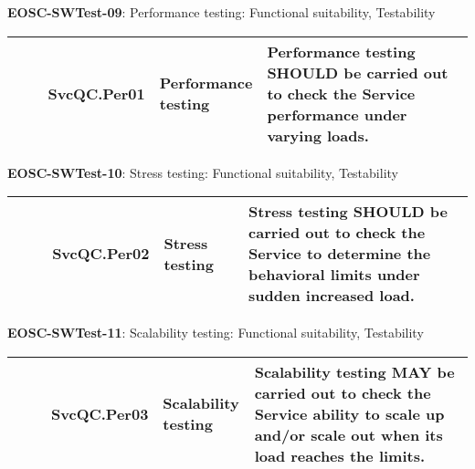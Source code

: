 \textbf{EOSC-SWTest-09}: Performance testing: Functional suitability, Testability
\nopagebreak[4]
\begin{center}
    \tabletail{\hline}
    \tiny
    \begin{supertabular}{|p{0.10\linewidth}|p{0.10\linewidth}|p{0.20\linewidth}|p{0.60\linewidth}|} \hline
        \cite{orviz_fernandez_eosc-synergy_2020} & SvcQC.Per01 & Performance testing & Performance testing SHOULD be carried out to check the Service performance under varying loads.\\ \hline
    \end{supertabular}
\end{center}

\textbf{EOSC-SWTest-10}: Stress testing: Functional suitability, Testability
\nopagebreak[4]
\begin{center}
    \tabletail{\hline}
    \tiny
    \begin{supertabular}{|p{0.10\linewidth}|p{0.10\linewidth}|p{0.20\linewidth}|p{0.60\linewidth}|} \hline
        \cite{orviz_fernandez_eosc-synergy_2020} & SvcQC.Per02 & Stress testing & Stress testing SHOULD be carried out to check the Service to determine the behavioral limits under sudden increased load.\\ \hline
    \end{supertabular}
\end{center}

\textbf{EOSC-SWTest-11}: Scalability testing: Functional suitability, Testability
\nopagebreak[4]
\begin{center}
    \tabletail{\hline}
    \tiny
    \begin{supertabular}{|p{0.10\linewidth}|p{0.10\linewidth}|p{0.20\linewidth}|p{0.60\linewidth}|} \hline
        \cite{orviz_fernandez_eosc-synergy_2020} & SvcQC.Per03 & Scalability testing & Scalability testing MAY be carried out to check the Service ability to scale up and/or scale out when its load reaches the limits.\\ \hline
    \end{supertabular}
\end{center}

